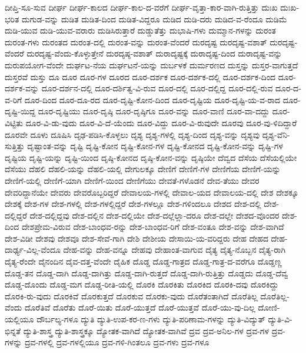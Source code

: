 {ದೀಪ್ತಿ-ಸೂ-ಸುವ
ದೀರ್ಘ
ದೀರ್ಘ-ಕಾಲದ
ದೀರ್ಘ-ಕಾಲ-ದ-ವರೆಗೆ
ದೀರ್ಘ-ವೃತ್ತಾ-ಕಾರ-ವಾಗಿ-ರುತ್ತಿತ್ತು
ದುಃಖ
ದುಃಖ-ಭರಿತ
ದುಗುಡ-ವನ್ನು
ದುಡಿತ
ದುಡಿತ-ದಿಂದ
ದುಡಿತ-ವಿದ್ದರೂ
ದುಡಿದ
ದುಡಿ-ದರು
ದುಡಿದ-ವ-ರೆಂದೂ
ದುಡಿಮೆ
ದುಡಿ-ಯುವ
ದುಡಿ-ಯುವ-ವರಾರು
ದುಡಿಸಿರುತ್ತಾರೆ
ದುಡ್ಡುತೆತ್ತು
ದುಭಾಷಿ-ಗಳು
ದುಮ್ಮಾನ-ಗಳನ್ನು
ದುರಂತ
ದುರಂತ-ಗಳು
ದುರಂತದ
ದುರಂತ-ದಲ್ಲಿ
ದುರಂತ-ವನ್ನು
ದುರಂತ-ವೆಂದರೆ
ದುರದೃಷ್ಟ
ದುರದೃಷ್ಟ-ವಶಾತ್
ದುರದೃಷ್ಟ-ವೆಂದರೆ
ದುರದೃಷ್ಟ-ವೆಂದು-ಕೊಳ್ಳುತ್ತೇನೆ
ದುರದೃಷ್ಠ-ವಶಾತ್
ದುರಾದೃಷ್ಟಕ್ಕೆ
ದುರಾದೃಷ್ಟ-ದಿಂದ
ದುರಾದೃಷ್ಟ-ವನ್ನು
ದುರುಪಯೋಗ-ವೆಂದೇ
ದುರ್ಘಟ-ನೆಯ
ದುರ್ಘಟನೆ-ಯನ್ನು
ದುರ್ಬಳಕೆ
ದುರ್ಮರಣದ
ದುಸ್ತನ್ನು
ದುಸ್ತರ-ವಾಗುತ್ತದೆ
ದುಸ್ತರವೆ
ದುಸ್ತು
ದೂ
ದೂರ
ದೂರ-ಗಳ
ದೂರದ
ದೂರ-ದರ್ಶಕ
ದೂರ-ದರ್ಶಕ-ದಲ್ಲಿ
ದೂರ-ದರ್ಶಕ-ದಿಂದ
ದೂರ-ದರ್ಶಕ-ವನ್ನು
ದೂರ-ದರ್ಶನ-ದಲ್ಲಿ
ದೂರ-ದರ್ಶಿತ್ವ-ವಿ-ರುವ
ದೂರ-ದಲ್ಲಿ
ದೂರ-ದಲ್ಲಿದ್ದ
ದೂರ-ದಲ್ಲಿ-ರುವ
ದೂರ-ದ-ವ-ರಿಗೆ
ದೂರ-ದಿಂದ
ದೂರ-ದೂ-ರದ
ದೂರ-ದೃಷ್ಟಿ-ಕೋನ-ದಿಂದ
ದೂರ-ದೃಷ್ಟಿಯ
ದೂರ-ದೃಷ್ಟಿ-ಯ-ವ-ರಾದ
ದೂರ-ದೃಷ್ಟಿ-ಯಿದ್ದ
ದೂರ-ದೃಷ್ಟಿಯು
ದೂರ-ದೃಷ್ಠಿ
ದೂರ-ದೃಷ್ಠಿಗೂ
ದೂರ-ವನ್ನು
ದೂರ-ವಾಣಿ
ದೂರ-ವಾ-ದದ್ದು
ದೂರ-ವಿಟ್ಟಿತು
ದೂರ-ವಿ-ಡು-ವುದು
ದೂರ-ವಿ-ದೆ-ಯೆಂದು
ದೂರ-ವಿದ್ದು
ದೂರ-ವಿ-ರುವುದೇ
ದೂರವು
ದೂರ-ವು-ಳಿದಿದ್ದಾರೆ
ದೂರವೇ
ದೂಳು
ದೂಷಿಸಿ
ದೃಢ-ಪಡಿಸಿ-ಕೊಳ್ಳಲು
ದೃಶ್ಯ
ದೃಶ್ಯ-ಗಳಲ್ಲಿ
ದೃಶ್ಯ-ದಿಂದ
ದೃಶ್ಯ-ವನ್ನು
ದೃಶ್ಯವು
ದೃಶ್ಯ-ವೆನಿ-ಸುತ್ತಿತ್ತು
ದೃಷ್ಟಾಂತ-ವನ್ನು
ದೃಷ್ಟಿ
ದೃಷ್ಟಿ-ಕೋನ
ದೃಷ್ಟಿ-ಕೋನ-ಗಳ
ದೃಷ್ಟಿ-ಕೋನದ
ದೃಷ್ಟಿ-ಕೋನ-ವನ್ನು
ದೃಷ್ಟಿ-ಗಳ
ದೃಷ್ಟಿಯ
ದೃಷ್ಟಿ-ಯನ್ನು
ದೃಷ್ಟಿ-ಯಿಂದ
ದೃಷ್ಠಿ-ಕೋನದ
ದೃಷ್ಠಿ-ಕೋನ-ವನ್ನು
ದೃಷ್ಠಿಯೇ
ದೆವ್ವದ
ದೆಸೆಯ
ದೆಸೆಯಲ್ಲಿಯೇ
ದೆಸೆಯು
ದೆಹಲಿ
ದೆಹಲಿ-ಯನ್ನು
ದೆಹಲಿ-ಯಲ್ಲಿ
ದೇಗುಲಕ್ಕೂ
ದೇಣಿಗೆ
ದೇಣಿಗೆ-ಗಳ
ದೇಣಿಗೆಯ
ದೇಣಿಗೆ-ಯನ್ನು
ದೇಣಿಗೆ-ಯಲ್ಲಿ
ದೇಣಿಗೆ-ಯಾಗಿ
ದೇಣಿಗೆ-ಯಿಂದ
ದೇಣಿಗೆಯು
ದೇವತೆ-ಗಳೊಡನೆ
ದೇವ-ತೆಯು
ದೇವರ
ದೇವರಿದ್ದಾನೆಯೇ
ದೇವರು
ದೇವರೊಬ್ಬರಿದ್ದರೆ
ದೇವಾಲಯ-ಗಳಲ್ಲಿ
ದೇವಾಲ-ಯದ
ದೇವಾಲಯ-ದಲ್ಲಿ
ದೇಶ
ದೇಶಕ್ಕೂ
ದೇಶಕ್ಕೆ
ದೇಶ-ಗಳ
ದೇಶ-ಗಳಲ್ಲಿ
ದೇಶ-ಗಳಲ್ಲಿದ್ದರೆ
ದೇಶ-ಗಳಲ್ಲೂ
ದೇಶ-ಗಳಿಂದಲೂ
ದೇಶದ
ದೇಶ-ದಲ್ಲಿ
ದೇಶ-ದಲ್ಲಿದ್ದರೆ
ದೇಶ-ದಲ್ಲಿದ್ದವು
ದೇಶ-ದಲ್ಲಿನ
ದೇಶ-ದಲ್ಲಿಯೇ
ದೇಶ-ದಲ್ಲೆಲ್ಲಾ-ದರೂ
ದೇಶ-ದಲ್ಲೇ
ದೇಶದ-ವೊಂದರ
ದೇಶ-ದಿಂದ
ದೇಶಪ್ರೇಮ-ವಿರುವ
ದೇಶ-ಬಾಂಧವ-ರನ್ನು
ದೇಶ-ಬಾಂಧವ-ರಿಗೆ
ದೇಶ-ವಂತೂ
ದೇಶ-ವನ್ನು
ದೇಶ-ವಾಗಿದೆ
ದೇಶ-ವಿಡೀ
ದೇಶವು
ದೇಶವೂ
ದೇಶ-ಸೇವೆ-ಗಾಗಿ
ದೇಶಿ
ದೇಶೀಯ
ದೇಸಾಯಿ-ಯ-ವರಿದ್ದರು
ದೇಹ
ದೇಹದ
ದೇಹ-ದಾರ್ಢ್ಯ-ವಿಲ್ಲ-ವೆಂದೂ
ದೇಹ-ವನ್ನು
ದೇಹ-ವನ್ನೂ
ದೇಹವು
ದೇಹಾಂತ-ವಾಗುವ
ದೈತ್ಯ
ದೈತ್ಯ-ನೊಬ್ಬನ
ದೈತ್ಯ-ರಾಗಿ
ದೈತ್ಯ-ರೆಂದೇ
ದೈನಂದಿನ
ದೈವ-ದತ್ತ-ವೆಂದೇ
ದೈಹಿಕ
ದೊಡ್ಡ
ದೊಡ್ಡ-ಗಾತ್ರದ
ದೊಡ್ಡ-ಗಾತ್ರ-ದ-ವರೆಗೂ
ದೊಡ್ಡಣ್ಣ
ದೊಡ್ಡ-ತನ
ದೊಡ್ಡ-ದಾಗಿ
ದೊಡ್ಡ-ದಾಗಿತ್ತು
ದೊಡ್ಡ-ದಾಗಿ-ರುತ್ತದೆ
ದೊಡ್ಡ-ದಾಗಿ-ರುತ್ತಿತ್ತು
ದೊಡ್ಡದು
ದೊಡ್ಡ-ದೆವ್ವ
ದೊಡ್ಡ-ದೊಂದು
ದೊಡ್ಡ-ಮಗ
ದೊಡ್ಡ-ರೀತಿ-ಯಲ್ಲಿ
ದೊರಕಿ
ದೊರಕಿತು
ದೊರಕಿದ
ದೊರಕಿ-ದವು
ದೊರಕಿದ್ದು
ದೊರಕಿ-ರು-ವುದು
ದೊರಕಿವೆ
ದೊರಕುತ್ತದೆ
ದೊರಕುವ
ದೊರಕು-ವುದು
ದೊರೆತಂತಾಗಿದೆ
ದೊರೆತಿಲ್ಲ
ದೊರೆತಿಲ್ಲ-ವೆಂದು
ದೊರೆತಿವೆ
ದೊರೆತು
ದೊರೆ-ಯಿತು
ದೊರೆ-ಯುತ್ತದೆ
ದೊರೆ-ಯುತ್ತವೆ
ದೊರೆ-ಯು-ವು-ದಿಲ್ಲ
ದೋಣಿ-ಯಲ್ಲಿಯೂ
ದೌರ್ಬಲ್ಯ-ಗಳೂ
ದ್ಯುತಿ
ದ್ಯುತಿ-ಉಪ-ಕರ-ಣ-ಗಳು
ದ್ಯುತಿ-ಪರಿಣಾಮ-ಗಳನ್ನು
ದ್ಯುತಿ-ವಿದ್ಯುತ್
ದ್ಯುತಿ-ವಿ-ಭಿನ್ನತೆ
ದ್ಯುತಿ-ಶಾಸ್ತ್ರ
ದ್ಯುತಿ-ಶಾಸ್ತ್ರಕ್ಕೂ
ದ್ಯೋತಕ-ವಾಗಿದೆ
ದ್ಯೋತಕ-ವಾಗಿವೆ
ದ್ರವ
ದ್ರವ-ಅನಿಲ-ಗಳ
ದ್ರವ-ಗಳ
ದ್ರವ-ಗಳನ್ನು
ದ್ರವ-ಗಳಲ್ಲಿ
ದ್ರವ-ಗಳಲ್ಲಿಯೂ
ದ್ರವ-ಗಳಿ-ಗಿಂತಲೂ
ದ್ರವ-ಗಳು
ದ್ರವ-ಗಳೂ
}
